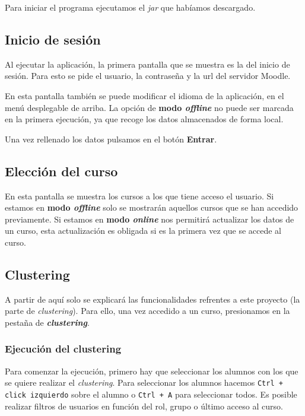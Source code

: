 Para iniciar el programa ejecutamos el \emph{jar} que habíamos descargado.

\subsection{Inicio de sesión}
Al ejecutar la aplicación, la primera pantalla que se muestra es la del inicio de sesión. Para esto se pide el usuario, la contraseña y la url del servidor Moodle.


En esta pantalla también se puede modificar el idioma de la aplicación, en el menú desplegable de arriba. La opción de \textbf{modo \emph{offline}} no puede ser marcada en la primera ejecución, ya que recoge los datos almacenados de forma local.

Una vez rellenado los datos pulsamos en el botón \textbf{Entrar}.

\subsection{Elección del curso}
En esta pantalla se muestra los cursos a los que tiene acceso el usuario. Si estamos en \textbf{modo \emph{offline}} solo se mostrarán aquellos cursos que se han accedido previamente. Si estamos en \textbf{modo \emph{online}} nos permitirá actualizar los datos de un curso, esta actualización es obligada si es la primera vez que se accede al curso.


\subsection{Clustering}
A partir de aquí solo se explicará las funcionalidades refrentes a este proyecto (la parte de \emph{clustering}). Para ello, una vez accedido a un curso, presionamos en la pestaña de \textbf{\emph{clustering}}.

\subsubsection{Ejecución del clustering} \label{sssection:ejecutar}
Para comenzar la ejecución, primero hay que seleccionar los alumnos con los que se quiere realizar el \emph{clustering}. Para seleccionar los alumnos hacemos \texttt{Ctrl + click izquierdo} sobre el alumno o \texttt{Ctrl + A} para seleccionar todos. Es posible realizar filtros de usuarios en función del rol, grupo o último acceso al curso.

